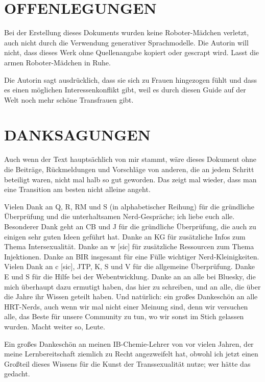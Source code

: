 \documentclass{article}
\begin{document}
\section*{OFFENLEGUNGEN}

Bei der Erstellung dieses Dokuments wurden keine Roboter-Mädchen verletzt, auch nicht durch die Verwendung generativer Sprachmodelle. Die Autorin will nicht, dass dieses Werk ohne Quellenangabe kopiert oder gescrapt wird. Lasst die armen Roboter-Mädchen in Ruhe.

Die Autorin sagt ausdrücklich, dass sie sich zu Frauen hingezogen fühlt und dass es einen möglichen Interessenkonflikt gibt, weil es durch diesen Guide auf der Welt noch mehr schöne Transfrauen gibt.

 

\section*{DANKSAGUNGEN}

Auch wenn der Text hauptsächlich von mir stammt, wäre dieses Dokument ohne die Beiträge, Rückmeldungen und Vorschläge von anderen, die an jedem Schritt beteiligt waren, nicht mal halb so gut geworden. Das zeigt mal wieder, dass man eine Transition  am besten nicht alleine angeht.

Vielen Dank an Q, R, RM und S (in alphabetischer Reihung) für die gründliche Überprüfung und die unterhaltsamen Nerd-Gespräche; ich liebe euch alle. Besonderer Dank geht an CB und J für die gründliche Überprüfung, die auch zu einigen sehr guten Ideen geführt hat. Danke an KG für zusätzliche Infos zum Thema Intersexualität. Danke an w [sic] für zusätzliche Ressourcen zum Thema Injektionen. Danke an BIR insgesamt für eine Fülle wichtiger Nerd-Kleinigkeiten. Vielen Dank an c [sic], JTP, K, S und V für die allgemeine Überprüfung. Danke E und S für die Hilfe bei der Webentwicklung. Danke an an alle bei Bluesky, die mich überhaupt dazu ermutigt haben, das hier zu schreiben, und an alle, die über die Jahre ihr Wissen geteilt haben. Und natürlich: ein großes Dankeschön an alle HRT-Nerds, auch wenn wir mal nicht einer Meinung sind, denn wir versuchen alle, das Beste für unsere Community zu tun, wo wir sonst im Stich gelassen wurden. Macht weiter so, Leute.

Ein großes Dankeschön an meinen IB-Chemie-Lehrer von vor vielen Jahren, der meine Lernbereitschaft ziemlich zu Recht angezweifelt hat, obwohl ich jetzt einen Großteil dieses Wissens für die Kunst der Transsexualität nutze; wer hätte das gedacht.
\end{document}
